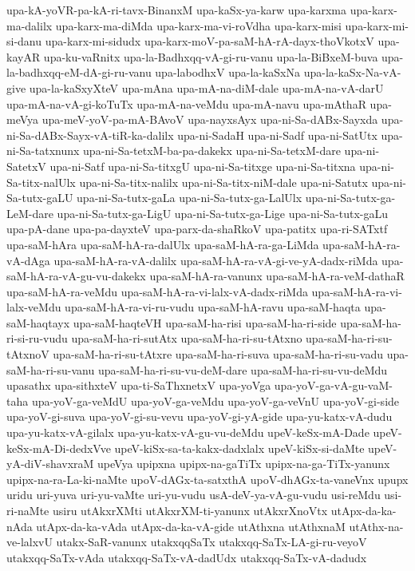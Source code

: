 {upa-kA-yoVR-pa-kA-ri-tavx-BinanxM
upa-kaSx-ya-karw
upa-karxma
upa-karx-ma-dalilx
upa-karx-ma-diMda
upa-karx-ma-vi-roVdha
upa-karx-misi
upa-karx-mi-si-danu
upa-karx-mi-sidudx
upa-karx-moV-pa-saM-hA-rA-dayx-thoVkotxV
upa-kayAR
upa-ku-vaRnitx
upa-la-Badhxqq-vA-gi-ru-vanu
upa-la-BiBxeM-buva
upa-la-badhxqq-eM-dA-gi-ru-vanu
upa-labodhxV
upa-la-kaSxNa
upa-la-kaSx-Na-vA-give
upa-la-kaSxyXteV
upa-mAna
upa-mA-na-diM-dale
upa-mA-na-vA-darU
upa-mA-na-vA-gi-koTuTx
upa-mA-na-veMdu
upa-mA-navu
upa-mAthaR
upa-meVya
upa-meV-yoV-pa-mA-BAvoV
upa-nayxsAyx
upa-ni-Sa-dABx-Sayxda
upa-ni-Sa-dABx-Sayx-vA-tiR-ka-dalilx
upa-ni-SadaH
upa-ni-Sadf
upa-ni-SatUtx
upa-ni-Sa-tatxnunx
upa-ni-Sa-tetxM-ba-pa-dakekx
upa-ni-Sa-tetxM-dare
upa-ni-SatetxV
upa-ni-Satf
upa-ni-Sa-titxgU
upa-ni-Sa-titxge
upa-ni-Sa-titxna
upa-ni-Sa-titx-nalUlx
upa-ni-Sa-titx-nalilx
upa-ni-Sa-titx-niM-dale
upa-ni-Satutx
upa-ni-Sa-tutx-gaLU
upa-ni-Sa-tutx-gaLa
upa-ni-Sa-tutx-ga-LalUlx
upa-ni-Sa-tutx-ga-LeM-dare
upa-ni-Sa-tutx-ga-LigU
upa-ni-Sa-tutx-ga-Lige
upa-ni-Sa-tutx-gaLu
upa-pA-dane
upa-pa-dayxteV
upa-parx-da-shaRkoV
upa-patitx
upa-ri-SATxtf
upa-saM-hAra
upa-saM-hA-ra-dalUlx
upa-saM-hA-ra-ga-LiMda
upa-saM-hA-ra-vA-dAga
upa-saM-hA-ra-vA-dalilx
upa-saM-hA-ra-vA-gi-ve-yA-dadx-riMda
upa-saM-hA-ra-vA-gu-vu-dakekx
upa-saM-hA-ra-vanunx
upa-saM-hA-ra-veM-dathaR
upa-saM-hA-ra-veMdu
upa-saM-hA-ra-vi-lalx-vA-dadx-riMda
upa-saM-hA-ra-vi-lalx-veMdu
upa-saM-hA-ra-vi-ru-vudu
upa-saM-hA-ravu
upa-saM-haqta
upa-saM-haqtayx
upa-saM-haqteVH
upa-saM-ha-risi
upa-saM-ha-ri-side
upa-saM-ha-ri-si-ru-vudu
upa-saM-ha-ri-sutAtx
upa-saM-ha-ri-su-tAtxno
upa-saM-ha-ri-su-tAtxnoV
upa-saM-ha-ri-su-tAtxre
upa-saM-ha-ri-suva
upa-saM-ha-ri-su-vadu
upa-saM-ha-ri-su-vanu
upa-saM-ha-ri-su-vu-deM-dare
upa-saM-ha-ri-su-vu-deMdu
upasathx
upa-sithxteV
upa-ti-SaThxnetxV
upa-yoVga
upa-yoV-ga-vA-gu-vaM-taha
upa-yoV-ga-veMdU
upa-yoV-ga-veMdu
upa-yoV-ga-veVnU
upa-yoV-gi-side
upa-yoV-gi-suva
upa-yoV-gi-su-vevu
upa-yoV-gi-yA-gide
upa-yu-katx-vA-dudu
upa-yu-katx-vA-gilalx
upa-yu-katx-vA-gu-vu-deMdu
upeV-keSx-mA-Dade
upeV-keSx-mA-Di-dedxVve
upeV-kiSx-sa-ta-kakx-dadxlalx
upeV-kiSx-si-daMte
upeV-yA-diV-shavxraM
upeVya
upipxna
upipx-na-gaTiTx
upipx-na-ga-TiTx-yanunx
upipx-na-ra-La-ki-naMte
upoV-dAGx-ta-satxthA
upoV-dhAGx-ta-vaneVnx
upupx
uridu
uri-yuva
uri-yu-vaMte
uri-yu-vudu
usA-deV-ya-vA-gu-vudu
usi-reMdu
usi-ri-naMte
usiru
utAkxrXMti
utAkxrXM-ti-yanunx
utAkxrXnoVtx
utApx-da-ka-nAda
utApx-da-ka-vAda
utApx-da-ka-vA-gide
utAthxna
utAthxnaM
utAthx-na-ve-lalxvU
utakx-SaR-vanunx
utakxqqSaTx
utakxqq-SaTx-LA-gi-ru-veyoV
utakxqq-SaTx-vAda
utakxqq-SaTx-vA-dadUdx
utakxqq-SaTx-vA-dadudx
}
